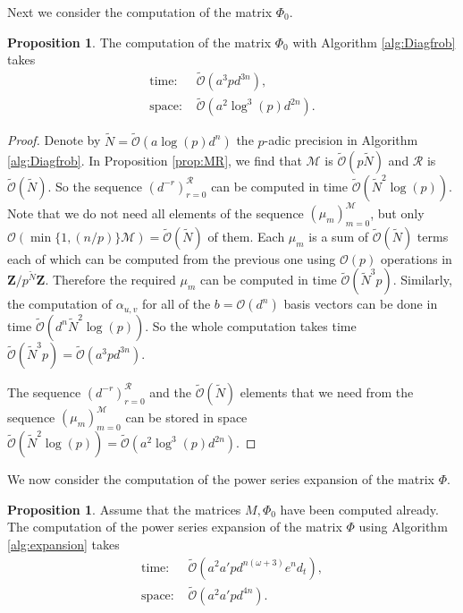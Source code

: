 \documentclass[a4paper,11pt]{article}
\numberwithin{equation}{section}
\newcommand{\ZZ}{\mathbf{Z}} %
\theoremstyle{definition}
\newtheorem{prop}[thm]{Proposition}
\begin{document}
Next we consider the computation of the matrix $\Phi_0$. 
\begin{prop}
The computation of the matrix $\Phi_0$ with Algorithm \ref{alg:Diagfrob} takes
\begin{align*}
\mbox{time: }  &\tilde{\mathcal{O}}(a^3 p d^{3n}), \\
\mbox{space: } &\tilde{\mathcal{O}}(a^2 \log^3(p) d^{2n}).
\end{align*}
\end{prop}

\begin{proof}
Denote by $\tilde{N}=\tilde{\mathcal{O}}(a \log(p) d^n)$ the $p$-adic precision in Algorithm \ref{alg:Diagfrob}. 
In Proposition \ref{prop:MR}, we find that
$\mathcal{M}$ is $\tilde{\mathcal{O}}(p \tilde{N})$ and $\mathcal{R}$ is $\tilde{\mathcal{O}}(\tilde{N})$. 
So the sequence $(d^{-r})_{r=0}^{\mathcal{R}}$ can be computed in time $\tilde{\mathcal{O}}(\tilde{N}^2 \log(p))$. 
Note that we do not need all elements of the sequence $( \mu_{m} )_{m=0}^{\mathcal{M}}$, but only
$\mathcal{O} ( \min \{ 1,(n/p) \} \mathcal{M} ) = \tilde{ \mathcal{O} }(\tilde{N})$ of them. 
Each $\mu_m$ is a sum of $\tilde{ \mathcal{O} }(\tilde{N})$ terms each of which can be computed
from the previous one using $\mathcal{O}(p)$ operations in $\ZZ/p^{\tilde{N}}\ZZ$. Therefore the required
$\mu_m$ can be computed in time $\tilde{\mathcal{O}}(\tilde{N}^3 p)$. Similarly, the computation of $\alpha_{u,v}$ for all of 
the $b=\mathcal{O}(d^n)$ basis vectors can be done in time $\tilde{\mathcal{O}}(d^n \tilde{N}^2 \log(p))$. So 
the whole computation takes time $\tilde{\mathcal{O}}(\tilde{N}^3p)=\tilde{\mathcal{O}}(a^3 p d^{3n})$.

The sequence $(d^{-r})_{r=0}^{\mathcal{R}}$ and the $\tilde{\mathcal{O}}(\tilde{N})$ elements that we need
from the sequence $( \mu_{m} )_{m=0}^{\mathcal{M}}$ can be stored in space 
$\tilde{\mathcal{O}}(\tilde{N}^2 \log(p)) = \tilde{\mathcal{O}}(a^2 \log^3(p) d^{2n})$.
\end{proof}

We now consider the computation of the power series expansion of the matrix $\Phi$.

\begin{prop}
Assume that the matrices $M, \Phi_0$ have been computed already. The computation of the power series expansion
of the matrix $\Phi$ using Algorithm \ref{alg:expansion} takes
\begin{align*}
\mbox{time: }  &\tilde{\mathcal{O}}(a^2 a' p d^{n(\omega+3)}e^n d_t), \\
\mbox{space: } &\tilde{\mathcal{O}}(a^2 a' p d^{4n}).
\end{align*}
\end{prop}
\end{document}
